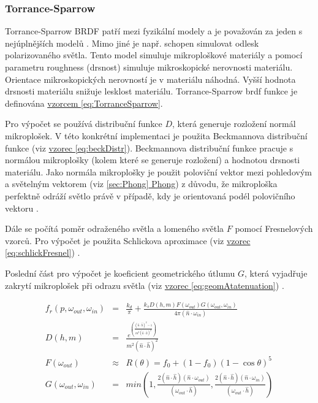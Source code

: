 \documentclass[czech,master,dept460,male,cpp,cpdeclaration]{diploma}
\newcommand{\uvec}[1]{\hat{#1}}
\begin{document}
\subsubsection{Torrance-Sparrow} \label{sec:torrancesparrow}
Torrance-Sparrow BRDF patří mezi fyzikální modely a je považován za jeden s nejúplnějších modelů \cite{BRDFOverview}. Mimo jiné je např. schopen simulovat odlesk polarizovaného světla. Tento model simuluje mikroploškové materiály a pomocí parametru roughness (drsnost) simuluje mikroskopické nerovnosti materiálu. Orientace mikroskopických nerovností je v materiálu náhodná. Vyšší hodnota drsnosti materiálu snižuje lesklost materiálu. Torrance-Sparrow brdf funkce je definována \hyperref[eq:TorranceSparrow]{vzorcem \ref{eq:TorranceSparrow}}. \par
Pro výpočet se používá distribuční funkce \(D\), která generuje rozložení normál mikroplošek. V této konkrétní implementaci je použita Beckmannova distribuční funkce (viz \hyperref[eq:beckDistr]{vzorec \ref{eq:beckDistr}}). Beckmannova distribuční funkce pracuje s normálou mikroplošky (kolem které se generuje rozložení) a hodnotou drsnosti materiálu. Jako normála mikroplošky je použit poloviční vektor mezi pohledovým a světelným vektorem (viz \hyperref[sec:Phong]{\ref{sec:Phong} Phong}) z důvodu, že mikroploška perfektně odráží světlo právě v případě, kdy je orientovaná podél polovičního vektoru \cite{PHARR2017507}. \par
Dále se počítá poměr odraženého světla a lomeného světla \(F\) pomocí Fresnelových vzorců. Pro výpočet je použita Schlickova aproximace (viz \hyperref[eq:schlickFresnel]{vzorec \ref{eq:schlickFresnel}}) \cite{SchlickFresnel}. \par
Poslední část pro výpočet je koeficient geometrického útlumu \(G\), která vyjadřuje zakrytí mikroplošek při odrazu světla (viz \hyperref[eq:geomAtatenuation]{vzorec \ref{eq:geomAtatenuation}}) \cite{BRDFOverview}.


\begin{eqnarray}
    f_r\left(p,\omega_{out},\omega_{in}\right) & = & \frac{k_d}{\pi} + \frac{k_sD(h,m)F(\omega_{out})G(\omega_{out},\omega_{in})}{4\pi (\uvec{n}\cdot \omega_{in})}\label{eq:TorranceSparrow}\\
    D(h,m) & = & \frac{e^{\left(\frac{(\uvec{n}\cdot \uvec{h})^2-1}{m^2(\uvec{n}\cdot \uvec{h})^2}\right)}}{m^2(\uvec{n}\cdot \uvec{h})^2}\label{eq:beckDistr}\\
    F(\omega_{out}) & \approx & R(\theta) = f_0 + (1-f_0)(1-\cos\theta)^5\label{eq:schlickFresnel}\\
    G(\omega_{out},\omega_{in}) & = & min \left( 1, \frac{2 ( \uvec{n} \cdot \uvec{h} ) ( \uvec{n} \cdot \omega_{out} )
        }{ ( \omega_{out} \cdot \uvec{h} ) },\frac{ 2 ( \uvec{n} \cdot \uvec{h} ) ( \uvec{n} \cdot \omega_{in} ) }{ ( \omega_{out} \cdot \uvec{h} ) } \right) \label{eq:geomAtatenuation}
\end{eqnarray}
\end{document}
